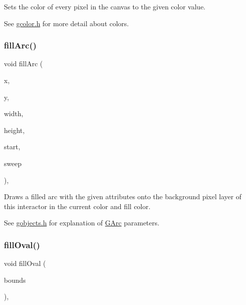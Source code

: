 Sets the color of every pixel in the canvas to the given color value. 

See \mbox{\hyperlink{gcolor_8h_source}{gcolor.\+h}} for more detail about colors. \mbox{\label{classGDrawingSurface_a228075ad18bd97b57f9956568c4773f3}} 
\subsubsection{\texorpdfstring{fill\+Arc()}{fillArc()}}
{\footnotesize\ttfamily void fill\+Arc (\begin{DoxyParamCaption}\item[{double}]{x,  }\item[{double}]{y,  }\item[{double}]{width,  }\item[{double}]{height,  }\item[{double}]{start,  }\item[{double}]{sweep }\end{DoxyParamCaption})\hspace{0.3cm}{\ttfamily [virtual]}, {\ttfamily [inherited]}}



Draws a filled arc with the given attributes onto the background pixel layer of this interactor in the current color and fill color. 

See \mbox{\hyperlink{gobjects_8h_source}{gobjects.\+h}} for explanation of \mbox{\hyperlink{classGArc}{G\+Arc}} parameters. \mbox{\label{classGDrawingSurface_a1ea6e48d59fb588797dba4deab1397e0}} 
\subsubsection{\texorpdfstring{fill\+Oval()}{fillOval()}\hspace{0.1cm}{\footnotesize\ttfamily [1/2]}}
{\footnotesize\ttfamily void fill\+Oval (\begin{DoxyParamCaption}\item[{const \mbox{\hyperlink{structGRectangle}{G\+Rectangle}} \&}]{bounds }\end{DoxyParamCaption})\hspace{0.3cm}{\ttfamily [virtual]}, {\ttfamily [inherited]}}



